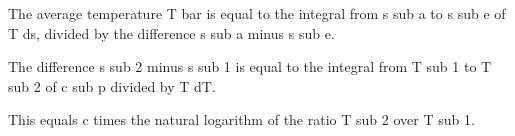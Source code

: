 The average temperature T bar is equal to the integral from s sub a to s sub e of T ds, divided by the difference s sub a minus s sub e.

The difference s sub 2 minus s sub 1 is equal to the integral from T sub 1 to T sub 2 of c sub p divided by T dT.

This equals c times the natural logarithm of the ratio T sub 2 over T sub 1.